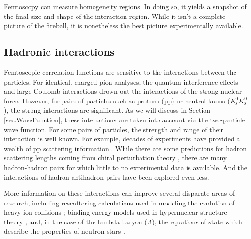 Femtoscopy can measure homogeneity regions.
In doing so, it yields a snapshot of the final size and shape of the interaction region.
While it isn't a complete picture of the fireball, it is nonetheless the best picture experimentally available.

\subsection{Hadronic interactions}
\label{sec:HadronicInteractions}


Femtoscopic correlation functions are sensitive to the interactions between the particles.
For identical, charged pion analyses, the quantum interference effects and large Coulomb interactions drown out the interactions of the strong nuclear force.
However, for pairs of particles such as protons (pp) or neutral kaons ($K^0_\mathrm{s}K^0_\mathrm{s}$), the strong interactions are significant.
As we will discuss in Section \ref{sec:WaveFunction}, these interactions are taken into account via the two-particle wave function.
For some pairs of particles, the strength and range of their interaction is well known. For example, decades of experiments have provided a wealth of pp scattering information \cite{Perez:2013jpa}.
While there are some predictions for hadron scattering lengths coming from chiral perturbation theory \cite{Mai:2009ce}, there are many hadron-hadron pairs for which little to no experimental data is available. And the interactions of hadron-antihadron pairs have been explored even less.

More information on these interactions can improve several disparate areas of research, including rescattering calculations used in modeling the evolution of heavy-ion collisions \cite{Bleicher:1999xi}; binding energy models used in hypernuclear structure theory \cite{Hiyama:2002yj,Filikhin:2002wm}; and, in the case of the lambda baryon ($\Lambda$), the equations of state which describe the properties of neutron stars \cite{SchaffnerBielich:2008kb,Wang:2010gr}.

